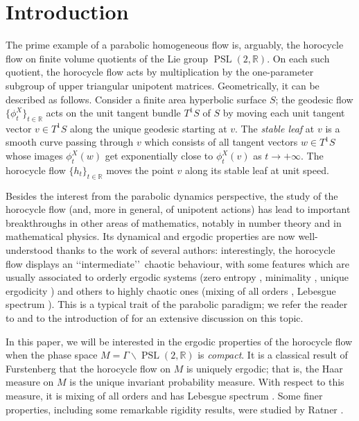 \documentclass[11pt]{article}
\newcommand \R{\mathbb{R}}
\DeclareMathOperator{\PSL}{PSL}
\theoremstyle{definition}
\begin{document}
\section{Introduction}\label{sec:introduction}

The prime example of a parabolic homogeneous flow is, arguably, the horocycle flow on finite volume quotients of the Lie group $\PSL(2,\R)$.
On each such quotient, the horocycle flow acts by multiplication by the one-parameter subgroup of upper triangular unipotent matrices.
Geometrically, it can be described as follows. Consider a finite area hyperbolic surface $S$; the geodesic flow $\{ \phi^X_t\}_{t \in \R}$ acts on the unit tangent bundle $T^1S$ of $S$ by moving each unit tangent vector $v \in T^1S$ along the unique geodesic starting at $v$. The \emph{stable leaf} at $v$ is a smooth curve passing through $v$ which consists of all tangent vectors $w \in T^1S$ whose images $\phi^X_t(w)$ get exponentially close to $\phi^X_t(v)$ as $t \to +\infty$. The horocycle flow $\{h_t\}_{t \in \R}$ moves the point $v$ along its stable leaf at unit speed.\enlargethispage{\baselineskip}

Besides the interest from the parabolic dynamics perspective, the study of the horocycle flow (and, more in general, of unipotent actions) has lead to important breakthroughs in other areas of mathematics, notably in number theory and in mathematical physics.
Its dynamical and ergodic properties are now well-understood thanks to the work of several authors: interestingly, the horocycle flow displays an \lq\lq intermediate\rq\rq\ chaotic behaviour, with some features which are usually associated to orderly ergodic systems (zero entropy \cite{Gur}, minimality \cite{Hed}, unique ergodicity \cite{Fur}) and others to highly chaotic ones (mixing of all orders \cite{Mar}, Lebesgue spectrum \cite{Par}). This is a typical trait of the parabolic paradigm; we refer the reader to \cite[Chap.\,8]{HasKat} and to the introduction of \cite{AFRU} for an extensive discussion on this topic.

In this paper, we will be interested in the ergodic properties of the horocycle flow when the phase space $M = \Gamma \backslash \PSL(2,\R)$ is \emph{compact}.
It is a classical result of Furstenberg \cite{Fur} that the horocycle flow on $M$ is uniquely ergodic; that is, the Haar measure on $M$ is the unique invariant probability measure.
With respect to this measure, it is mixing of all orders \cite{Mar} and has Lebesgue spectrum \cite{GeFo, Par}.
Some finer properties, including some remarkable rigidity results, were studied by Ratner \cite{Rat2, Rat4, Rat3}.
\end{document}
